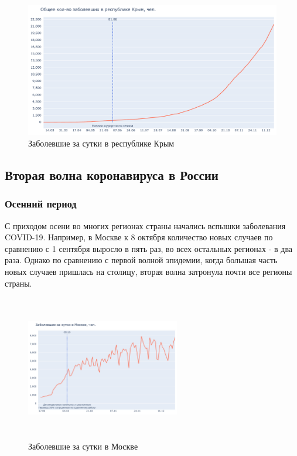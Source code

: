 \documentclass[a4paper, 12pt]{extarticle}
\begin{document}
\begin{figure}[h]
    \centering
    \includegraphics[scale=0.5]{../plots/9republic_of_crimea.pdf}
    \caption{Заболевшие за сутки в республике Крым}
    \label{fig:total_confirmed_crimea}
\end{figure}
\newpage

\subsection{Вторая волна коронавируса в России}
\subsubsection{Осенний период}

С приходом осени во многих регионах страны начались вспышки заболевания
COVID-19. Например, в Москве к 8 октября количество новых случаев по сравнению
с 1 сентября выросло в пять раз, во всех остальных регионах - в два раза.
Однако по сравнению с первой волной эпидемии, когда большая часть новых случаев
пришлась на столицу, вторая волна затронула почти все регионы страны.
\\

\begin{figure}
    \centering
    \vspace{-15pt}
    \includegraphics[height=180pt, width=0.6\textwidth]{../plots/7daily_confirmed_with_events_moscow_2.pdf}
    \caption{Заболевшие за сутки в Москве}
    \label{fig:day_confirmed_moscow_with_events}
\end{figure}
\end{document}
